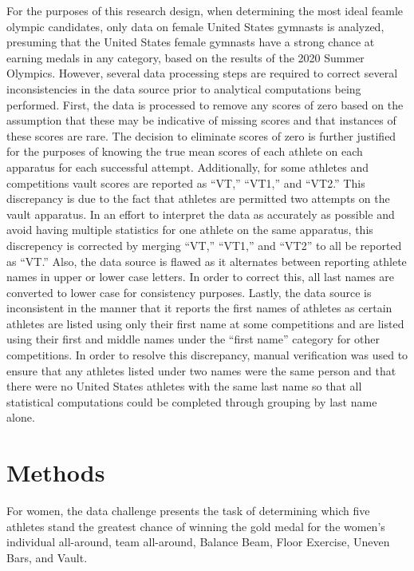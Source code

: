 \documentclass[12pt]{article}
\begin{document}
For the purposes of this research design, when determining the most ideal feamle olympic candidates, 
only data on female United States gymnasts is analyzed, presuming that the United States 
female gymnasts have a strong chance at earning medals in any category, based on the results of the 2020 Summer Olympics. 
However, several data processing steps are required to correct several inconsistencies in the data source prior to 
analytical computations being performed.
First, the data is processed to remove any scores of zero based on the assumption that these may 
be indicative of missing scores and that instances of these scores are rare. The decision to eliminate scores of 
zero is further justified for the purposes of knowing the true mean scores of each athlete on each 
apparatus for each successful attempt. Additionally, for some athletes and competitions vault
scores are reported as ``VT,'' ``VT1,'' and ``VT2.'' This discrepancy is due to the fact that athletes are permitted
two attempts on the vault apparatus. In an effort to interpret the data as accurately as possible and avoid having 
multiple statistics for one athlete on the same apparatus, this discrepency is corrected by merging ``VT,'' ``VT1,'' and 
``VT2'' to all be reported as ``VT.'' Also, the data source is flawed as it alternates between reporting athlete names
in upper or lower case letters. In order to correct this, all last names are converted to lower case for consistency 
purposes. Lastly, the data source is inconsistent in the manner that it reports the first names of athletes as certain
athletes are listed using only their first name at some competitions and are listed using their first and middle names 
under the ``first name'' category for other competitions. In order to resolve this discrepancy, manual verification was used
to ensure that any athletes listed under two names were the same person and that there were no United States  
athletes with the same last name so that all statistical computations could be completed through grouping by last 
name alone.

\section{Methods}
\label{sec:meth}

For women, the data challenge presents the task of determining 
which five athletes stand the greatest chance of winning the gold medal for the women's individual all-around,
team all-around, Balance Beam, Floor Exercise, Uneven Bars, and Vault. 
\end{document}
